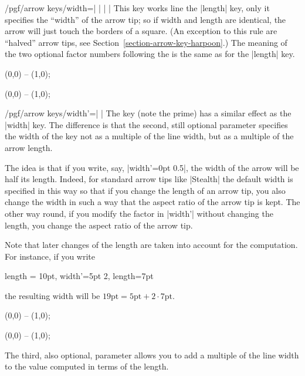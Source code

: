 \begin{key}{/pgf/arrow keys/width=| |%
        | |}
    This key works line the |length| key, only it specifies the ``width'' of
    the arrow tip; so if width and length are identical, the arrow will just
    touch the borders of a square. (An exception to this rule are ``halved''
    arrow tips, see Section~\ref{section-arrow-key-harpoon}.) The meaning of
    the two optional factor numbers following the  is the same
    as for the |length| key.
\begin{codeexample}[]
\tikz \draw [arrows = {-Latex[width=10pt, length=10pt]}] (0,0) -- (1,0);
\end{codeexample}
\begin{codeexample}[]
\tikz \draw [arrows = {-Latex[width=0pt 10, length=10pt]}] (0,0) -- (1,0);
\end{codeexample}
\end{key}

\begin{key}{/pgf/arrow keys/width'=| |}
    The key (note the prime) has a similar effect as the |width| key. The
    difference is that the second, still optional parameter  specifies the width of the key not as a multiple of the line width,
    but as a multiple of the arrow length.

    The idea is that if you write, say, |width'=0pt 0.5|, the width of the
    arrow will be half its length. Indeed, for standard arrow tips like
    |Stealth| the default width is specified in this way so that if you change
    the length of an arrow tip, you also change the width in such a way that
    the aspect ratio of the arrow tip is kept. The other way round, if you
    modify the factor in |width'| without changing the length, you change the
    aspect ratio of the arrow tip.

    Note that later changes of the length are taken into account for the
    computation. For instance, if you write
\begin{codeexample}
length = 10pt, width'=5pt 2, length=7pt
\end{codeexample}
    the resulting width will be $19\mathrm{pt} = 5\mathrm{pt} + 2\cdot
    7\mathrm{pt}$.
\begin{codeexample}[]
\tikz \draw [arrows = {-Latex[width'=0pt .5, length=10pt]}] (0,0) -- (1,0);
\end{codeexample}
\begin{codeexample}[]
\tikz \draw [arrows = {-Latex[width'=0pt .5, length=15pt]}] (0,0) -- (1,0);
\end{codeexample}
    The third, also optional, parameter allows you to add a multiple of the
    line width to the value computed in terms of the length.
\end{key}



